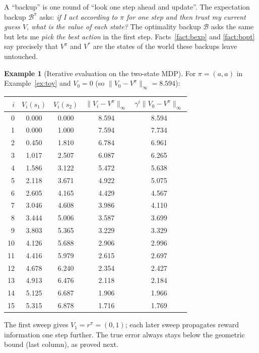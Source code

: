 \documentclass[11pt,a4paper]{article}
\newcommand{\Bell}{\mathcal{B}}
\newcommand{\Bpi}{\mathcal{B}^{\pi}}
\newcommand{\norm}[1]{\lVert #1\rVert_\infty}
\theoremstyle{plain}
\theoremstyle{definition}
\newtheorem{example}{Example}\renewcommand{\theexample}{E\arabic{example}}
\theoremstyle{remark}
\begin{document}
\begin{intuition}
A ``backup'' is one round of ``look one step ahead and update''. The expectation backup $\Bpi$ asks: \emph{if I act according to $\pi$ for one step and then trust my current guess $V$, what is the value of each state?} The optimality backup $\Bell$ asks the same but lets me \emph{pick the best action} in the first step. Facts~\ref{fact:bexp} and \ref{fact:bopt} say precisely that $V^\pi$ and $V^*$ are the states of the world these backups leave untouched.
\end{intuition}

\begin{example}[Iterative evaluation on the two-state MDP]\label{ex:pe}
For $\pi=(a,a)$ in Example~\ref{ex:toy} and $V_0=0$ (so $\norm{V_0-V^\pi}=8.594$):
\begin{center}
\begin{tabular}{@{}rcccc@{}}
\toprule
$i$ & $V_i(s_1)$ & $V_i(s_2)$ & $\norm{V_i-V^\pi}$ & $\gamma^i\norm{V_0-V^\pi}$\\
\midrule
0 & 0.000 & 0.000 & 8.594 & 8.594 \\
1 & 0.000 & 1.000 & 7.594 & 7.734 \\
2 & 0.450 & 1.810 & 6.784 & 6.961 \\
3 & 1.017 & 2.507 & 6.087 & 6.265 \\
4 & 1.586 & 3.122 & 5.472 & 5.638 \\
5 & 2.118 & 3.671 & 4.922 & 5.075 \\
6 & 2.605 & 4.165 & 4.429 & 4.567 \\
7 & 3.046 & 4.608 & 3.986 & 4.110 \\
8 & 3.444 & 5.006 & 3.587 & 3.699 \\
9 & 3.803 & 5.365 & 3.229 & 3.329 \\
10 & 4.126 & 5.688 & 2.906 & 2.996 \\
11 & 4.416 & 5.979 & 2.615 & 2.697 \\
12 & 4.678 & 6.240 & 2.354 & 2.427 \\
13 & 4.913 & 6.476 & 2.118 & 2.184 \\
14 & 5.125 & 6.687 & 1.906 & 1.966 \\
15 & 5.315 & 6.878 & 1.716 & 1.769 \\
\bottomrule
\end{tabular}
\end{center}
The first sweep gives $V_1=r^\pi=(0,1)$; each later sweep propagates reward information one step further. The true error always stays below the geometric bound (last column), as proved next.
\end{example}
\end{document}
